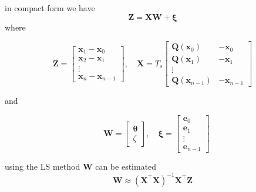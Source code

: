 \documentclass[twocolumn,11pt,a4paper]{article}		%
\begin{document}
 in compact form we have 
\begin{equation}
	\mathbf Z=\mathbf X \mathbf W+\boldsymbol \xi 
\end{equation}
where 
\begin{small}
\begin{equation*}
	\mathbf Z=\left[
	\begin{array}{cccc}
		\mathbf x_{1}-\mathbf x_{0}\\
		\mathbf x_{2}-\mathbf x_{1}\\\vdots\\
		\mathbf x_{n}-\mathbf x_{n-1}
	\end{array}
	\right],\quad \mathbf X=T_s\left[
	\begin{array}{cccc}
		\mathbf Q(\mathbf x_0)&-\mathbf x_{0}\\
		\mathbf Q(\mathbf x_1)&-\mathbf x_{1}\\\vdots\\
		\mathbf Q(\mathbf x_{n-1})&-\mathbf x_{n-1}
	\end{array}
	\right] 
\end{equation*}
\end{small}
and
\begin{small}
\begin{equation*}
\quad \mathbf W=\left[
	\begin{array}{cc}
		\boldsymbol{\theta} \\
		\zeta
	\end{array}
	\right],\quad \boldsymbol \xi=\left[
	\begin{array}{cccc}
		\mathbf e_0\\\mathbf e_1\\\vdots\\\mathbf e_{n-1}
	\end{array}
	\right] 
\end{equation*}
\end{small}
using the LS method $ \mathbf W$ can be estimated 
\begin{equation}
	\mathbf W\approx(\mathbf X^\top\mathbf X)^{-1}\mathbf X^\top\mathbf Z 
\end{equation}
\end{document}
